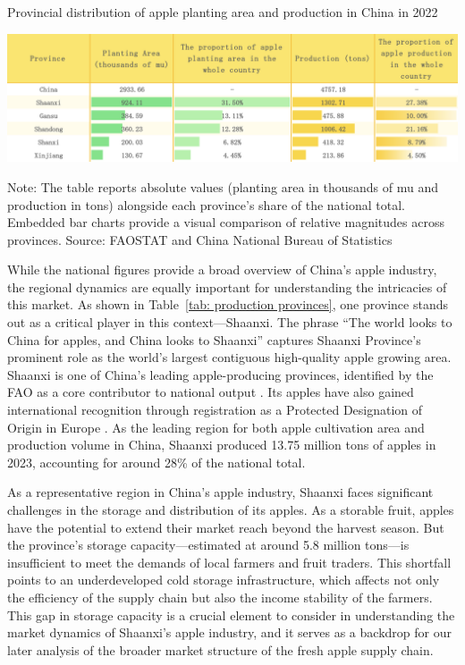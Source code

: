 \begin{table}[hpt]
    \centering
        \caption{Provincial distribution of apple planting area and production in China in 2022}
    \includegraphics[width=\linewidth]{tables/production_provinces_table.png}
    \label{tab: production provinces}
    \begin{tablenotes}
    \footnotesize
    \item Note: The table reports absolute values (planting area in thousands of mu and production in tons) alongside each province's share of the national total. Embedded bar charts provide a visual comparison of relative magnitudes across provinces. Source: FAOSTAT and China National Bureau of Statistics
    \end{tablenotes}
\end{table}


While the national figures provide a broad overview of China's apple industry, the regional dynamics are equally important for understanding the intricacies of this market. As shown in Table~\ref{tab: production provinces}, one province stands out as a critical player in this context—Shaanxi. The phrase ``The world looks to China for apples, and China looks to Shaanxi'' captures Shaanxi Province's prominent role as the world's largest contiguous high-quality apple growing area. Shaanxi is one of China's leading apple-producing provinces, identified by the FAO as a core contributor to national output \citep{FAO2004}. Its apples have also gained international recognition through registration as a Protected Designation of Origin in Europe \citep{UKGov2021}. As the leading region for both apple cultivation area and production volume in China, Shaanxi produced 13.75 million tons of apples in 2023, accounting for around 28\% of the national total.

As a representative region in China's apple industry, Shaanxi faces significant challenges in the storage and distribution of its apples. As a storable fruit, apples have the potential to extend their market reach beyond the harvest season. But the province's storage capacity—estimated at around 5.8 million tons—is insufficient to meet the demands of local farmers and fruit traders. This shortfall points to an underdeveloped cold storage infrastructure, which affects not only the efficiency of the supply chain but also the income stability of the farmers. This gap in storage capacity is a crucial element to consider in understanding the market dynamics of Shaanxi's apple industry, and it serves as a backdrop for our later analysis of the broader market structure of the fresh apple supply chain.



